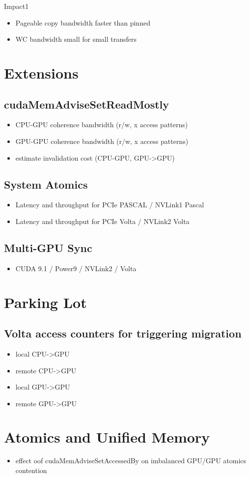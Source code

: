 Impact1
\begin{itemize}
    \item Pageable copy bandwidth faster than pinned
    \item WC bandwidth small for small transfers
\end{itemize}


\section{Extensions}
\subsection{cudaMemAdviseSetReadMostly}
\begin{itemize}
    \item CPU-GPU coherence bandwidth (r/w, x access patterns)
    \item GPU-GPU coherence bandwidth (r/w, x access patterns)
    \item estimate invalidation cost (CPU-GPU, GPU->GPU)
\end{itemize}

\subsection{System Atomics}
\begin{itemize}
    \item Latency and throughput for PCIe PASCAL / NVLink1 Pascal 
    \item Latency and throughput for PCIe Volta / NVLink2 Volta
\end{itemize}

\subsection{Multi-GPU Sync}
\begin{itemize}
    \item CUDA 9.1 / Power9 / NVLink2 / Volta
\end{itemize}


\section{Parking Lot}
\subsection{Volta access counters for triggering migration}
\begin{itemize}
    \item local CPU->GPU
    \item remote CPU->GPU
    \item local GPU->GPU
    \item remote GPU->GPU
\end{itemize}


\section{Atomics and Unified Memory}
\begin{itemize}
    \item effect oof cudaMemAdviseSetAccessedBy on imbalanced GPU/GPU atomics contention
\end{itemize}